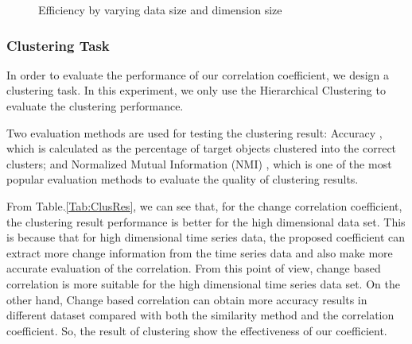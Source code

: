 \begin{figure}
\centering
{}\hspace{0.001em}
\hspace{0.001em}
\caption{Efficiency by varying data size and dimension size}
\label{fig:NNPerf}
\end{figure}


\subsubsection{Clustering Task}

In order to evaluate the performance of our correlation coefficient, we design a clustering task. In this experiment, we only use the Hierarchical Clustering \cite{han2011data} to evaluate the clustering performance.

Two evaluation methods are used for testing the clustering result: Accuracy \cite{han2011data}, which is calculated as the percentage of target objects clustered into the correct clusters; and Normalized Mutual Information (NMI) \cite{han2011data}, which is one of the most popular evaluation methods to evaluate the quality of clustering results.

From Table.\ref{Tab:ClusRes}, we can see that, for the change correlation coefficient, the clustering result performance is better for the high dimensional data set.
This is because that for high dimensional time series data, the proposed coefficient can extract more change information from the time series data and also make more accurate evaluation of the correlation. 
From this point of view, change based correlation is more suitable for the high dimensional time series data set.
On the other hand, Change based correlation can obtain more accuracy results in different dataset compared with both the similarity method and the correlation coefficient. So, the result of clustering show the effectiveness of our coefficient.


